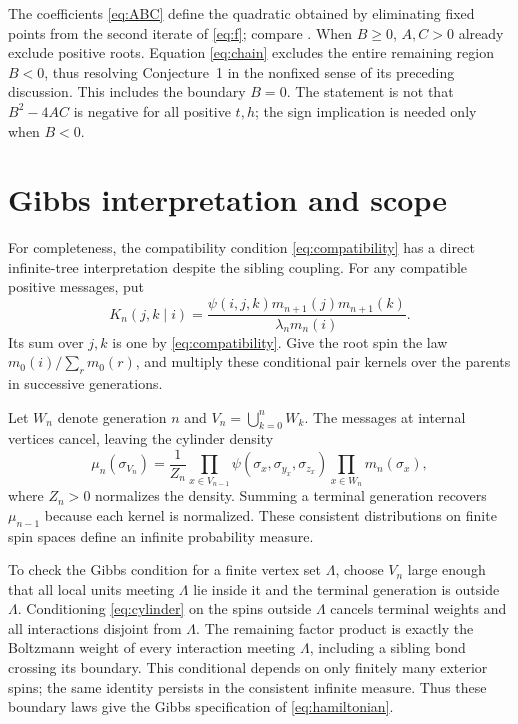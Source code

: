 \documentclass[11pt,a4paper]{article}
\numberwithin{equation}{section}
\begin{document}
The coefficients \eqref{eq:ABC} define the quadratic obtained by
eliminating fixed points from the second iterate of \eqref{eq:f};
compare \citet[Eq.~(17), p.~139]{KR2025}. When $B\ge0$, $A,C>0$ already
exclude positive roots. Equation \eqref{eq:chain} excludes the entire
remaining region $B<0$, thus resolving Conjecture~1 in the nonfixed
sense of its preceding discussion. This includes the boundary $B=0$.
The statement is not that $B^2-4AC$ is negative for all positive $t,h$;
the sign implication is needed only when $B<0$.

\section{Gibbs interpretation and scope}
\label{sec:gibbs}
For completeness, the compatibility condition \eqref{eq:compatibility}
has a direct infinite-tree interpretation despite the sibling coupling.
For any compatible positive messages, put
\begin{equation}
 K_n(j,k\mid i)=
 \frac{\psi(i,j,k)m_{n+1}(j)m_{n+1}(k)}
      {\lambda_n m_n(i)}.
 \label{eq:kernel}
\end{equation}
Its sum over $j,k$ is one by \eqref{eq:compatibility}. Give the root
spin the law $m_0(i)/\sum_r m_0(r)$, and multiply these conditional
pair kernels over the parents in successive generations.

Let $W_n$ denote generation $n$ and $V_n=\bigcup_{k=0}^n W_k$.
The messages at internal vertices cancel, leaving the cylinder density
\begin{equation}
 \mu_n(\sigma_{V_n})=\frac{1}{Z_n}
 \prod_{x\in V_{n-1}}
 \psi(\sigma_x,\sigma_{y_x},\sigma_{z_x})
 \prod_{x\in W_n}m_n(\sigma_x),
 \label{eq:cylinder}
\end{equation}
where $Z_n>0$ normalizes the density. Summing a terminal generation
recovers $\mu_{n-1}$ because each kernel is normalized. These
consistent distributions on finite spin spaces define an infinite
probability measure.

To check the Gibbs condition for a finite vertex set $\Lambda$,
choose $V_n$ large enough that all local units meeting $\Lambda$
lie inside it and the terminal generation is outside $\Lambda$.
Conditioning \eqref{eq:cylinder} on the spins outside $\Lambda$
cancels terminal weights and all interactions disjoint from $\Lambda$.
The remaining factor product is exactly the Boltzmann weight of every
interaction meeting $\Lambda$, including a sibling bond crossing its
boundary. This conditional depends on only finitely many exterior
spins; the same identity persists in the consistent infinite measure.
Thus these boundary laws give the Gibbs specification of
\eqref{eq:hamiltonian}.
\end{document}

